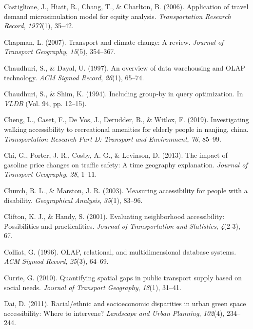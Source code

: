 \documentclass[
11pt, %
oneside, %
english, %
singlespacing, %
]{macthesis} %
\newlength{\cslhangindent}
\newenvironment{CSLReferences}[2] %
 {%
  \setlength{\parindent}{0pt}
  \ifodd #1 \everypar{\setlength{\hangindent}{\cslhangindent}}\ignorespaces\fi
  \ifnum #2 > 0
  \setlength{\parskip}{#2\baselineskip}
  \fi
 }%
 {}
\begin{document}
\begin{CSLReferences}{1}{0}
Castiglione, J., Hiatt, R., Chang, T., \& Charlton, B. (2006). Application of travel demand microsimulation model for equity analysis. \emph{Transportation Research Record}, \emph{1977}(1), 35--42.

Chapman, L. (2007). Transport and climate change: A review. \emph{Journal of Transport Geography}, \emph{15}(5), 354--367.

Chaudhuri, S., \& Dayal, U. (1997). An overview of data warehousing and OLAP technology. \emph{ACM Sigmod Record}, \emph{26}(1), 65--74.

Chaudhuri, S., \& Shim, K. (1994). Including group-by in query optimization. In \emph{VLDB} (Vol. 94, pp. 12--15).

Cheng, L., Caset, F., De Vos, J., Derudder, B., \& Witlox, F. (2019). Investigating walking accessibility to recreational amenities for elderly people in nanjing, china. \emph{Transportation Research Part D: Transport and Environment}, \emph{76}, 85--99.

Chi, G., Porter, J. R., Cosby, A. G., \& Levinson, D. (2013). The impact of gasoline price changes on traffic safety: A time geography explanation. \emph{Journal of Transport Geography}, \emph{28}, 1--11.

Church, R. L., \& Marston, J. R. (2003). Measuring accessibility for people with a disability. \emph{Geographical Analysis}, \emph{35}(1), 83--96.

Clifton, K. J., \& Handy, S. (2001). Evaluating neighborhood accessibility: Possibilities and practicalities. \emph{Journal of Transportation and Statistics}, \emph{4}(2-3), 67.

Colliat, G. (1996). OLAP, relational, and multidimensional database systems. \emph{ACM Sigmod Record}, \emph{25}(3), 64--69.

Currie, G. (2010). Quantifying spatial gaps in public transport supply based on social needs. \emph{Journal of Transport Geography}, \emph{18}(1), 31--41.

Dai, D. (2011). Racial/ethnic and socioeconomic disparities in urban green space accessibility: Where to intervene? \emph{Landscape and Urban Planning}, \emph{102}(4), 234--244.


\end{CSLReferences}
\end{document}
